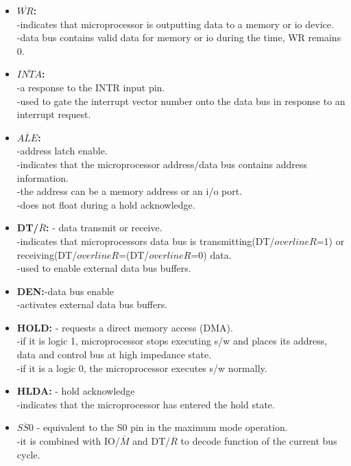 \documentclass[12pt]{article}
\begin{document}
\begin{itemize}
\begin{itemize}
		\item \textbf{$\overline{WR}$:} \\
		-indicates that microprocessor is outputting data to a memory or io device.\\
		-data bus contains valid data for memory or io during the time, WR remains 0.
		
		\item \textbf{$\overline{INTA}$:} \\
		-a response to the INTR input pin.\\
		-used to gate the interrupt vector number onto the data bus in response to an interrupt request.
		
		\item \textbf{$\overline{ALE}$:} \\
		-address latch enable.\\
		-indicates that the microprocessor address/data bus contains address information.\\
		-the address can be a memory address or an i/o port.\\
		-does not float during a hold acknowledge.
		
		\item\textbf{DT/$\overline{R}$:} - data transmit or receive.\\
		-indicates that microprocessors data bus is transmitting(DT/$overline{R}$=1) or receiving(DT/$overline{R}$=(DT/$overline{R}$=0) data.\\
		-used to enable external data bus buffers.
		
		\item\textbf{DEN:}-data bus enable\\
		-activates external data bus buffers.
		
		\item\textbf{HOLD:} - requests a direct memory access (DMA).\\
		-if it is logic 1, microprocessor stops executing s/w and places its address, data and control bus at high impedance state.\\
		-if it is a logic 0, the microprocessor executes s/w normally.
		
		\item\textbf{HLDA:} - hold acknowledge\\
		-indicates that the microprocessor has entered the hold state.
		
		\item\textbf{$\overline{SS0}$} - equivalent to the S0 pin in the maximum mode operation.\\
		-it is combined with IO/$\overline{M}$ and DT/$\overline{R}$ to decode function of the current bus cycle.
		  

\end{itemize}
\end{itemize}
\end{document}
